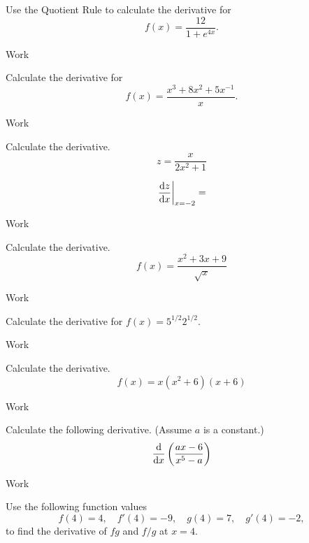\documentclass[12pt,addpoints, answers, fleqn]{exam}
\begin{document}
\begin{teacher}
\begin{questions}
\question 	%

Use the Quotient Rule to calculate the derivative for
\[
f\left(x\right) = \frac{12}{1 + e^{4x}}.
\]
\begin{solution}
Work
\end{solution}

\question 	%


Calculate the derivative for
\[
f\left(x\right) = \frac{x^3 + 8x^2 + 5x^{-1}}{x}.
\]
\begin{solution}
Work
\end{solution}


\question 	%

Calculate the derivative.
\[
z = \frac{x}{2x^2 + 1}
\]


\[
\left. \frac{{\rm{d}}z}{{\rm{d}}x} \right|_{x=-2} =
\]

\begin{solution}
Work
\end{solution}

\question 	%

Calculate the derivative.
\[
f\left( x \right) = \frac{x^2 + 3x + 9}{\sqrt{x}}
\]
\begin{solution}
Work
\end{solution}

\question 	%

Calculate the derivative for $f\left(x\right) = 5^{1/2}2^{1/2}$.

\begin{solution}
Work
\end{solution}

\question 	%


Calculate the derivative.
\[
f\left(x\right) = x\left(x^2 + 6\right)\left(x + 6\right)
\]
\begin{solution}
Work
\end{solution}

\question 	%

Calculate the following derivative. (Assume $a$ is a constant.)
\[
\frac{{\rm{d}}}{{\rm{d}}x} \left( \frac{ax-6}{x^5-a} \right)
\]


\begin{solution}
Work
\end{solution}

\question 	%
Use the following function values
\[
f\left( 4 \right) = 4, \quad f'\left( 4 \right) = -9, \quad g\left( 4 \right) = 7, \quad g'\left( 4 \right) = -2,
\]
to find the derivative of $fg$ and $f/g$ at $x = 4$.


\end{questions}
\end{teacher}
\end{document}
